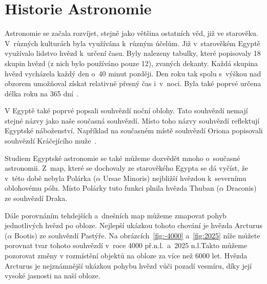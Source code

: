 \documentclass[12pt,a4paper,titlepage]{article}
\begin{document}
\section{Historie Astronomie}
Astronomie se začala rozvíjet, stejně jako většina ostatních věd, již ve starověku. V~různých kulturách byla využívána k~různým účelům. Již v~starověkém Egyptě využívalo lidstvo hvězd k~určení času. Byly nalezeny tabulky, které popisovaly 18 skupin hvězd (z nich bylo používáno pouze 12), zvaných dekanty. Každá skupina hvězd vycházela každý den o~40 minut později. Den roku tak spolu s~výškou nad obzorem umožňoval získat relativně přesný čas i~v~noci. Byla také poprvé určena délka roku na 365 dní~. 

V Egyptě také poprvé popsali souhvězdí noční oblohy. Tato souhvězdí nemají stejné názvy jako naše současná souhvězdí. Místo toho názvy souhvězdí reflektují Egyptské náboženství. Například na současném místě souhvězdí Oriona popisovali souhvězdí Kráčejícího muže~.

Studiem Egyptské astronomie se také můžeme dozvědět mnoho o~současné astronomii. Z~map, které se dochovaly ze starověkého Egypta se dá vyčíst, že v~této době nebyla Polárka ($\alpha$ Ursae Minoris) nejbližší hvězdou k~severnímu oblohovému pólu. Místo Polárky tuto funkci plnila hvězda Thuban ($\alpha$ Draconis) ze souhvězdí Draka. 

Dále porovnáním tehdejších a~dnešních map můžeme zmapovat pohyb jednotlivých hvězd po obloze. Nejlepší ukázkou tohoto chování je hvězda Arcturus ($\alpha$ Bootis) ze souhvězdí Pastýře. Na obrázcích~\ref{fig:-4000} a~\ref{fig:2025} níže můžete porovnat tvar tohoto souhvězdí v~roce 4000 př.n.l.\ a~2025 n.l.\@ Takto můžeme pozorovat změny v rozmístění objektů na obloze za více než 6000 let. Hvězda Arcturus je nejznámnější ukázkou pohybu hvězd vůči pozadí vesmíru, díky její vysoké jasnosti na naší obloze.
\end{document}
